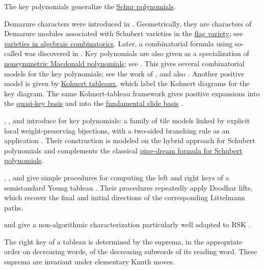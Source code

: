 The key polynomials generalize the \hyperref[schurS]{Schur polynomials}.

Demazure characters were introduced in \cite{Demazure1974nouvelle,Demazure1974}.
Geometrically, they are characters of Demazure modules associated with
Schubert varieties in the \hyperref[flagVarieties]{flag variety}; see
\hyperref[varietiesForKeys]{varieties in algebraic combinatorics}.
Later, a combinatorial formula using so-called
\label{keyTableau} was discovered in
\cite{Lascoux1990Keys}.
Key polynomials are also given as a specialization of
\hyperref[macdonaldE]{nonsymmetric Macdonald polynomials};
see \cite{HaglundHaimanLoehr2008}.  This gives several combinatorial
models for the key polynomials; see the work of 
\cite{Mason2009}, and also \cite{Kurland2016,AlexanderssonSawhney2019}.
Another positive model is given by \hyperref[kohnertTableaux]{Kohnert tableaux},
which label the Kohnert diagrams for the key diagram.
The same Kohnert-tableau framework gives positive expansions into the
\hyperref[quasiKey]{quasi-key basis} and into the
\hyperref[slideF]{fundamental slide basis} \cite{AssafSearles2018}.

, , and  introduce
 for key polynomials: a family of tile models linked
by explicit local weight-preserving bijections, with a two-sided branching rule
as an application \cite{XiaoXiongZhang2026}.  Their construction is modeled on
the hybrid approach for Schubert polynomials and complements the classical
\hyperref[schubertPipeDream]{pipe-dream formula for Schubert polynomials}.

,
, and  give
simple procedures for computing the left and right keys of a semistandard Young
tableau \cite{KushwahaRaghavanViswanath2023x}.  Their procedures repeatedly
apply Deodhar lifts, which recover the final and initial directions of the
corresponding Littelmann paths.

 and  give a non-algorithmic
characterization particularly well adapted to RSK
\cite{LapointePena2026Keysx}.

\begin{theorem}
\label{keyRightKeyDecreasingWords}
The right key of a tableau is determined by the suprema, in the appropriate
order on decreasing words, of the decreasing subwords of its reading word.
These suprema are invariant under elementary Knuth moves.
\end{theorem}

